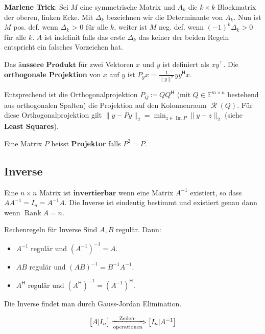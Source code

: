 \documentclass[a4paper,10pt]{article}
\DeclareMathOperator{\Rank}{Rank}
\DeclareMathOperator{\Image}{Im}
\DeclareMathOperator{\Columnspace}{\mathcal{R}}
\newcommand*{\hermconj}{\mathsf{H}}
\def\E{\mathbb{E}}
\begin{document}
\textbf{Marlene Trick}: Sei $M$ eine symmetrische Matrix und $A_k$ die $k \times k$ Blockmatrix der oberen, linken Ecke. Mit $\Delta_k$ bezeichnen wir die Determinante von $A_k$. Nun ist $M$ pos. def. wenn $\Delta_k$ > 0 für alle $k$, weiter ist $M$ neg. def.
wenn $(-1)^k \Delta_k > 0$ für alle $k$. $A$ ist indefinit falls das erste $\Delta_k$ das keiner der beiden Regeln entspricht ein falsches Vorzeichen hat.

Das $\textbf{äussere Produkt}$ für zwei Vektoren $x$ und $y$ ist definiert als $xy^\top$. Die \textbf{orthogonale Projektion} von $x$ auf $y$ ist $P_y x = \frac{1}{\lVert y \rVert^2} y y^\hermconj x$.

Entsprechend ist die Orthogonalprojektion $P_Q \coloneqq QQ^\hermconj$ (mit $Q \in \E^{m \times n}$ bestehend aus orthogonalen Spalten) die Projektion auf den Kolonnenraum $\Columnspace(Q)$. Für diese Orthogonalprojektion gilt $\lVert y - Py \rVert_2 = \min_{z \in \Image P} \lVert y - z \rVert_2$ (siehe \textbf{Least Squares}).

Eine Matrix $P$ heisst \textbf{Projektor} falls $P^2 = P$.

\subsection{Inverse}

Eine $n \times n$ Matrix ist $\textbf{invertierbar}$ wenn eine Matrix $A^{-1}$ existiert, so dass $A A^{-1} = I_n = A^{-1} A$. Die Inverse ist eindeutig bestimmt und existiert genau dann wenn $\Rank A = n$.

\begin{subbox}{Rechenregeln für Inverse}
  Sind $A, B$ regulär. Dann:

  \begin{itemize}
    \item $A^{-1}$ regulär und $(A^{-1})^{-1} = A$.
    \item $AB$ regulär und $(AB)^{-1} = B^{-1} A^{-1}$.
    \item $A^\hermconj$ regulär und $(A^\hermconj)^{-1} = (A^{-1})^\hermconj$.
  \end{itemize}
\end{subbox}

Die Inverse findet man durch Gauss-Jordan Elimination.

$$\begin{bmatrix*}
  A | I_n
\end{bmatrix*} \xRightarrow[\text{operationen}]{\text{Zeilen-}} \begin{bmatrix*}
  I_n | A^{-1}
\end{bmatrix*}$$
\end{document}
